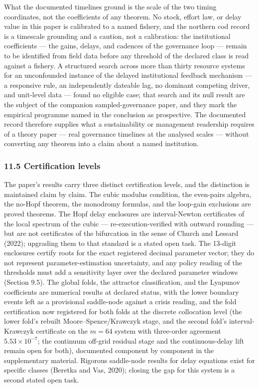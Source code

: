 \documentclass[11pt]{article}
\begin{document}
What the documented timelines ground is the scale of the two timing
coordinates, not the coefficients of any theorem. No stock, effort law,
or delay value in this paper is calibrated to a named fishery, and the
northern cod record is a timescale grounding and a caution, not a
calibration: the institutional coefficients --- the gains, delays, and
cadences of the governance loop --- remain to be identified from field
data before any threshold of the declared class is read against a
fishery. A structured search across more than thirty resource systems
for an unconfounded instance of the delayed institutional feedback
mechanism --- a responsive rule, an independently dateable lag, no
dominant competing driver, and unit-level data --- found no eligible
case; that search and its null result are the subject of the companion
sampled-governance paper, and they mark the empirical programme named in
the conclusion as prospective. The documented record therefore supplies
what a sustainability or management readership requires of a theory
paper --- real governance timelines at the analysed scales --- without
converting any theorem into a claim about a named institution.

\subsubsection{11.5 Certification levels}\label{certification-levels}

The paper's results carry three distinct certification levels, and the
distinction is maintained claim by claim. The cubic modulus condition,
the even-pairs algebra, the no-Hopf theorem, the monodromy formulas, and
the loop-gain exclusions are proved theorems. The Hopf delay enclosures
are interval-Newton certificates of the local spectrum of the cubic ---
re-execution-verified with outward rounding --- but are not certificates
of the bifurcation in the sense of Church and Lessard (2022); upgrading
them to that standard is a stated open task. The 13-digit enclosures
certify roots for the exact registered decimal parameter vector; they do
not represent parameter-estimation uncertainty, and any policy reading
of the thresholds must add a sensitivity layer over the declared
parameter windows (Section 9.5). The global folds, the attractor
classification, and the Lyapunov coefficients are numerical results at
declared status, with the lower boundary events left as a provisional
saddle-node against a crisis reading, and the fold certification now
registered for both folds at the discrete collocation level (the lower
fold's rebuilt Moore--Spence/Krawczyk stage, and the second fold's
interval-Krawczyk certificate on the \(m = 64\) system with three-order
agreement \(5.53\times10^{-7}\); the continuum off-grid residual stage
and the continuous-delay lift remain open for both), documented
component by component in the supplementary material. Rigorous
saddle-node results for delay equations exist for specific classes
(Beretka and Vas, 2020); closing the gap for this system is a second
stated open task.
\end{document}
